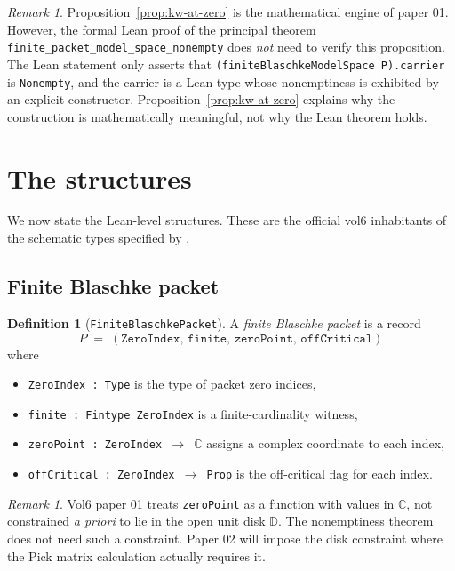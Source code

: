 \documentclass[11pt]{article}
\theoremstyle{plain}
\theoremstyle{definition}
\newtheorem{definition}[theorem]{Definition}
\theoremstyle{remark}
\newtheorem{remark}[theorem]{Remark}
\newcommand{\C}{\mathbb{C}}
\newcommand{\D}{\mathbb{D}}
\newcommand{\code}[1]{\texttt{#1}}
\begin{document}
\begin{remark}\label{rem:kw-not-needed}
Proposition~\ref{prop:kw-at-zero} is the mathematical engine of paper 01.
However, the formal Lean proof of the principal theorem
\code{finite\_packet\_model\_space\_nonempty} does \emph{not} need to
verify this proposition.  The Lean statement only asserts that
\code{(finiteBlaschkeModelSpace P).carrier} is \code{Nonempty}, and the
carrier is a Lean type whose nonemptiness is exhibited by an explicit
constructor.  Proposition~\ref{prop:kw-at-zero} explains why the
construction is mathematically meaningful, not why the Lean theorem holds.
\end{remark}

\section{The structures}\label{sec:structures}

We now state the Lean-level structures.  These are the official vol6
inhabitants of the schematic types specified by
\cite{vol5NextSteps}.

\subsection{Finite Blaschke packet}

\begin{definition}[\code{FiniteBlaschkePacket}]\label{def:fbp}
A \emph{finite Blaschke packet} is a record
\[
   P \;=\; (\code{ZeroIndex},\,\code{finite},\,\code{zeroPoint},\,\code{offCritical})
\]
where
\begin{itemize}
  \item \code{ZeroIndex : Type} is the type of packet zero indices,
  \item \code{finite : Fintype ZeroIndex} is a finite-cardinality witness,
  \item \code{zeroPoint : ZeroIndex \(\to\) \(\C\)} assigns a complex coordinate
        to each index,
  \item \code{offCritical : ZeroIndex \(\to\) Prop} is the off-critical
        flag for each index.
\end{itemize}
\end{definition}

\begin{remark}
Vol6 paper 01 treats \code{zeroPoint} as a function with values in $\C$, not
constrained \emph{a priori} to lie in the open unit disk $\D$.  The
nonemptiness theorem does not need such a constraint.  Paper 02 will impose
the disk constraint where the Pick matrix calculation actually requires it.
\end{remark}
\end{document}
